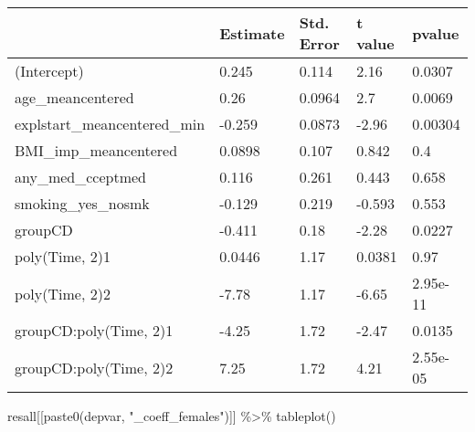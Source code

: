 \documentclass[
]{article}
\newenvironment{Shaded}{\begin{snugshade}}{\end{snugshade}}
\newcommand{\FunctionTok}[1]{\textcolor[rgb]{0.00,0.00,0.00}{#1}}
\newcommand{\NormalTok}[1]{#1}
\newcommand{\SpecialCharTok}[1]{\textcolor[rgb]{0.00,0.00,0.00}{#1}}
\newcommand{\StringTok}[1]{\textcolor[rgb]{0.31,0.60,0.02}{#1}}
\begin{document}
\begin{table}
\centering
\begin{tabular}[t]{l|l|l|l|l}
\hline
  & Estimate & Std. Error & t value & pvalue\\
\hline
(Intercept) & 0.245 & 0.114 & 2.16 & 0.0307\\
\hline
age\_meancentered & 0.26 & 0.0964 & 2.7 & 0.0069\\
\hline
explstart\_meancentered\_min & -0.259 & 0.0873 & -2.96 & 0.00304\\
\hline
BMI\_imp\_meancentered & 0.0898 & 0.107 & 0.842 & 0.4\\
\hline
any\_med\_cceptmed & 0.116 & 0.261 & 0.443 & 0.658\\
\hline
smoking\_yes\_nosmk & -0.129 & 0.219 & -0.593 & 0.553\\
\hline
groupCD & -0.411 & 0.18 & -2.28 & 0.0227\\
\hline
poly(Time, 2)1 & 0.0446 & 1.17 & 0.0381 & 0.97\\
\hline
poly(Time, 2)2 & -7.78 & 1.17 & -6.65 & 2.95e-11\\
\hline
groupCD:poly(Time, 2)1 & -4.25 & 1.72 & -2.47 & 0.0135\\
\hline
groupCD:poly(Time, 2)2 & 7.25 & 1.72 & 4.21 & 2.55e-05\\
\hline
\end{tabular}
\end{table}

\begin{Shaded}
\begin{Highlighting}[]
\NormalTok{resall[[}\FunctionTok{paste0}\NormalTok{(depvar, }\StringTok{"\_coeff\_females"}\NormalTok{)]] }\SpecialCharTok{\%\textgreater{}\%} \FunctionTok{tableplot}\NormalTok{()}
\end{Highlighting}
\end{Shaded}
\end{document}
